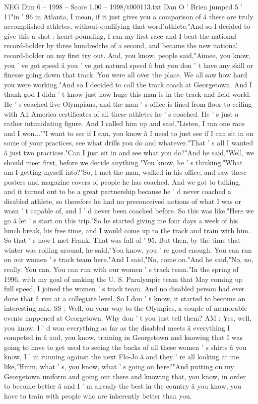 \begin{textsample}{NEG Dim 6 – 1998 – Score 1.00 – 1998/t000113.txt}
Dan O ' Brien jumped 5 ' 11"in ' 96 in Atlanta, I mean, if it just gives you a comparison of â these are truly accomplished athletes, without qualifying that word"athlete."And so I decided to give this a shot : heart pounding, I ran my first race and I beat the national record-holder by three hundredths of a second, and became the new national record-holder on my first try out.
And, you know, people said,"Aimee, you know, you ' ve got speed â you ' ve got natural speed â but you don ' t have any skill or finesse going down that track.
You were all over the place.
We all saw how hard you were working."And so I decided to call the track coach at Georgetown.
And I thank god I didn ' t know just how huge this man is in the track and field world.
He ' s coached five Olympians, and the man ' s office is lined from floor to ceiling with All America certificates of all these athletes he ' s coached.
He ' s just a rather intimidating figure.
And I called him up and said,"Listen, I ran one race and I won...""I want to see if I can, you know â I need to just see if I can sit in on some of your practices, see what drills you do and whatever."That ' s all I wanted â just two practices."Can I just sit in and see what you do?"And he said,"Well, we should meet first, before we decide anything."You know, he ' s thinking,"What am I getting myself into?"So, I met the man, walked in his office, and saw these posters and magazine covers of people he has coached.
And we got to talking, and it turned out to be a great partnership because he ' d never coached a disabled athlete, so therefore he had no preconceived notions of what I was or wasn ' t capable of, and I ' d never been coached before.
So this was like,"Here we go â let ' s start on this trip."So he started giving me four days a week of his lunch break, his free time, and I would come up to the track and train with him.
So that ' s how I met Frank.
That was fall of ' 95.
But then, by the time that winter was rolling around, he said,"You know, you ' re good enough.
You can run on our women ' s track team here."And I said,"No, come on."And he said,"No, no, really.
You can.
You can run with our women ' s track team."In the spring of 1996, with my goal of making the U.
S.
Paralympic team that May coming up full speed, I joined the women ' s track team.
And no disabled person had ever done that â run at a collegiate level.
So I don ' t know, it started to become an interesting mix.
SS : Well, on your way to the Olympics, a couple of memorable events happened at Georgetown.
Why don ' t you just tell them?
AM : Yes, well, you know, I ' d won everything as far as the disabled meets â everything I competed in â and, you know, training in Georgetown and knowing that I was going to have to get used to seeing the backs of all these women ' s shirts â you know, I ' m running against the next Flo-Jo â and they ' re all looking at me like,"Hmm, what ' s, you know, what ' s going on here?"And putting on my Georgetown uniform and going out there and knowing that, you know, in order to become better â and I ' m already the best in the country â you know, you have to train with people who are inherently better than you.

\end{textsample}
